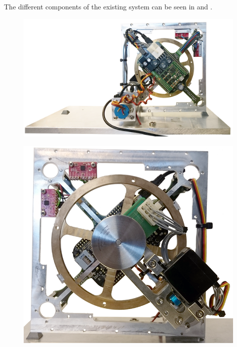 The different components of the existing system can be seen in  and .
%
  \begin{minipage}{\linewidth}
  	\begin{minipage}{0.45\linewidth}
  		\begin{figure}[H]
  			\includegraphics[scale=0.21]{figures/Cubli-5}
  			\centering
  			\vspace{-.4cm}
  			\captionsetup{justification=centering}
  			\label{Cubli-5}
  		\end{figure}\vspace{-5mm}
  	\end{minipage}
  	\hspace{0.11\linewidth}
  	\begin{minipage}{0.45\linewidth}
  		\begin{figure}[H]
  			\includegraphics[scale=.18]{figures/Cubli-6}
  			\centering
  			\vspace{.8cm}
  			\captionsetup{justification=centering}
  			\label{Cubli-6}
  		\end{figure}\vspace{-6mm}
  	\end{minipage}
  \end{minipage}
